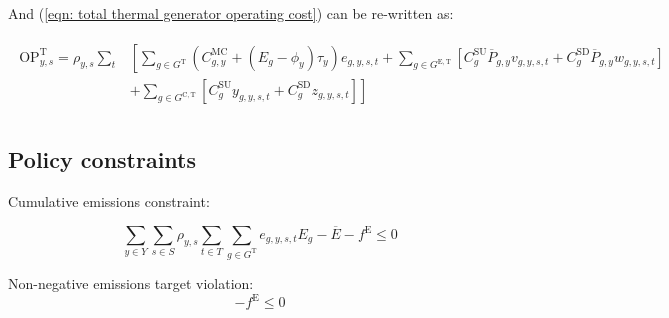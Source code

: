 \documentclass{article}
\newcommand{\sGeneratorsExistingThermal}{G^{\mathrm{E,T}}}
\newcommand{\sGeneratorsCandidate}{G^{\mathrm{C}}}
\newcommand{\sGeneratorsCandidateThermal}{G^{\mathrm{C,T}}}
\newcommand{\sGeneratorsThermal}{G^{\mathrm{T}}}
\newcommand{\sYears}{Y}
\newcommand{\sScenarios}{S}
\newcommand{\sIntervals}{T}
\newcommand{\iGenerator}{g}
\newcommand{\iYear}{y}
\newcommand{\iScenario}{s}
\newcommand{\iInterval}{t}
\newcommand{\cOperatingCostThermal}[1][\iYear,\iScenario]{\mathrm{OP}^{\mathrm{T}}_{#1}}
\newcommand{\cScenarioDuration}[1][\iYear,\iScenario]{\rho_{#1}}
\newcommand{\cMarginalCost}[1][\iGenerator,\iYear]{C^{\mathrm{MC}}_{#1}}
\newcommand{\cStartupCost}[1][\iGenerator]{C^{\mathrm{SU}}_{#1}}
\newcommand{\cShutdownCost}[1][\iGenerator]{C^{\mathrm{SD}}_{#1}}
\newcommand{\cEmissionsIntensity}[1][\iGenerator]{E_{#1}}
\newcommand{\cPowerOutputMax}[1][\iGenerator,\iYear]{\overline{P}_{#1}}
\newcommand{\cEmmissionsCumulativeTarget}{\overline{E}}
\newcommand{\cSchemeRevenueCumulativeTarget}{\overline{R}}
\newcommand{\vBaseline}[1][\iYear]{\phi_{#1}}
\newcommand{\vPermitPrice}[1][\iYear]{\tau_{#1}}
\newcommand{\vEnergy}[1][\iGenerator,\iYear,\iScenario,\iInterval]{e_{#1}}
\newcommand{\vStartupIndicator}[1][\iGenerator,\iYear,\iScenario,\iInterval]{v_{#1}}
\newcommand{\vShutdownIndicator}[1][\iGenerator,\iYear,\iScenario,\iInterval]{w_{#1}}
\newcommand{\vEmissionsTargetViolation}{f^{\mathrm{E}}}
\newcommand{\vInstalledCapacityStartupStateAux}[1][\iGenerator,\iYear,\iScenario,\iInterval]{y_{#1}}
\newcommand{\vInstalledCapacityShutdownStateAux}[1][\iGenerator,\iYear,\iScenario,\iInterval]{z_{#1}}
\begin{document}
And (\ref{eqn: total thermal generator operating cost}) can be re-written as:

\begin{align}
\begin{split}
\cOperatingCostThermal = \cScenarioDuration\sum\limits_{\iInterval} & \left[\sum\limits_{\iGenerator \in \sGeneratorsThermal} (\cMarginalCost + (\cEmissionsIntensity - \vBaseline)\vPermitPrice)\vEnergy + \sum\limits_{\iGenerator \in \sGeneratorsExistingThermal} \left[\cStartupCost \cPowerOutputMax \vStartupIndicator + \cShutdownCost \cPowerOutputMax \vShutdownIndicator\right] \right.\\
& \left. + \sum\limits_{\iGenerator \in \sGeneratorsCandidateThermal} \left[\cStartupCost \vInstalledCapacityStartupStateAux + \cShutdownCost \vInstalledCapacityShutdownStateAux \right] \right]\\
\end{split}
\end{align}

\subsection{Policy constraints}

Cumulative emissions constraint:

\begin{equation}
\sum\limits_{\iYear \in \sYears} \sum\limits_{\iScenario \in \sScenarios} \cScenarioDuration \sum\limits_{\iInterval \in \sIntervals} \sum\limits_{\iGenerator \in \sGeneratorsThermal} \vEnergy \cEmissionsIntensity - \cEmmissionsCumulativeTarget - \vEmissionsTargetViolation \leq 0
\label{eqn: cumulative emissions target}
\end{equation}

Non-negative emissions target violation:
\begin{equation}
	-\vEmissionsTargetViolation \leq 0
	\label{eqn: non negative emissions target violation}
\end{equation}

%
\end{document}
